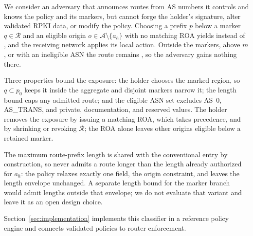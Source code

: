 {\revstart We consider an adversary that announces routes from AS numbers it controls and knows the policy and its markers, but cannot forge the holder's signature, alter validated RPKI data, or modify the policy. Choosing a prefix $p$ below a marker $q\in\mathcal{R}$ and an eligible origin $o\in\mathcal{A}\setminus\{a_h\}$ with no matching ROA yields \openscope{} instead of \invalid{}, and the receiving network applies its local action. Outside the markers, above $m$, or with an ineligible ASN the route remains \invalid{}, so the adversary gains nothing there.}

{\revstart Three properties bound the exposure: the holder chooses the marked region, so $q\subset p_0$ keeps it inside the aggregate and disjoint markers narrow it; the length bound caps any admitted route; and the eligible ASN set excludes AS~0, AS\_TRANS, and private, documentation, and reserved values. The holder removes the exposure by issuing a matching ROA, which takes precedence, and by shrinking or revoking $\mathcal{R}$; the ROA alone leaves other origins eligible below a retained marker.}

{\revstart The maximum route-prefix length is shared with the conventional entry by construction, so \openscope{} never admits a route longer than the length already authorized for $a_h$: the policy relaxes exactly one field, the origin constraint, and leaves the length envelope unchanged. A separate length bound for the marker branch would admit lengths outside that envelope; we do not evaluate that variant and leave it as an open design choice.}

Section~\ref{sec:implementation} implements this classifier in a reference policy engine and connects validated policies to router enforcement.
